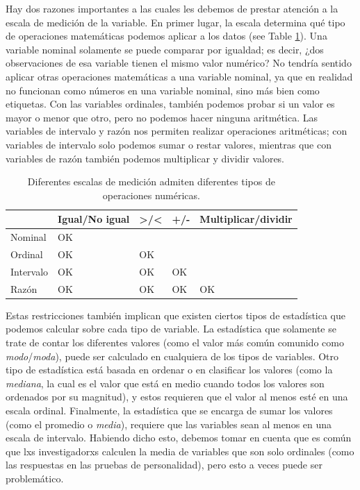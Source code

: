 \documentclass[
  12pt,
]{book}
\begin{document}
Hay dos razones importantes a las cuales les debemos de prestar atención a la escala de medición de la variable. En primer lugar, la escala determina qué tipo de operaciones matemáticas podemos aplicar a los datos (see Table \ref{tab:MeasurementTypes}). Una variable nominal solamente se puede comparar por igualdad; es decir, ¿dos observaciones de esa variable tienen el mismo valor numérico? No tendría sentido aplicar otras operaciones matemáticas a una variable nominal, ya que en realidad no funcionan como números en una variable nominal, sino más bien como etiquetas. Con las variables ordinales, también podemos probar si un valor es mayor o menor que otro, pero no podemos hacer ninguna aritmética. Las variables de intervalo y razón nos permiten realizar operaciones aritméticas; con variables de intervalo solo podemos sumar o restar valores, mientras que con variables de razón también podemos multiplicar y dividir valores.

\begin{table}

\caption{\label{tab:MeasurementTypes}Diferentes escalas de medición admiten diferentes tipos de operaciones numéricas.}
\centering
\begin{tabular}[t]{lllll}
\toprule
  & Igual/No igual & >/< & +/- & Multiplicar/dividir\\
\midrule
Nominal & OK &  &  & \\
Ordinal & OK & OK &  & \\
Intervalo & OK & OK & OK & \\
Razón & OK & OK & OK & OK\\
\bottomrule
\end{tabular}
\end{table}

Estas restricciones también implican que existen ciertos tipos de estadística que podemos calcular sobre cada tipo de variable. La estadística que solamente se trate de contar los diferentes valores (como el valor más común comunido como \emph{modo}/\emph{moda}), puede ser calculado en cualquiera de los tipos de variables. Otro tipo de estadística está basada en ordenar o en clasificar los valores (como la \emph{mediana}, la cual es el valor que está en medio cuando todos los valores son ordenados por su magnitud), y estos requieren que el valor al menos esté en una escala ordinal. Finalmente, la estadística que se encarga de sumar los valores (como el promedio o \emph{media}), requiere que las variables sean al menos en una escala de intervalo. Habiendo dicho esto, debemos tomar en cuenta que es común que lxs investigadorxs calculen la media de variables que son solo ordinales (como las respuestas en las pruebas de personalidad), pero esto a veces puede ser problemático.
\end{document}

